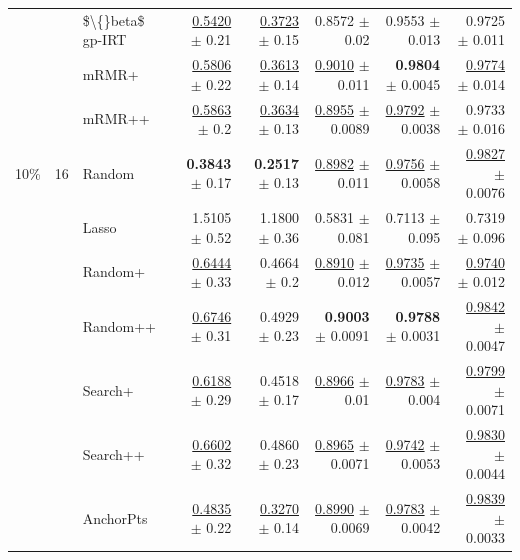 \begin{longtable}{llp{}rrrrr}
 &  & \$\textbackslash\{\}beta\$ gp-IRT & \underline{0.5420} {\scriptsize $\pm$ 0.21} & \underline{0.3723} {\scriptsize $\pm$ 0.15} & 0.8572 {\scriptsize $\pm$ 0.02} & 0.9553 {\scriptsize $\pm$ 0.013} & 0.9725 {\scriptsize $\pm$ 0.011} \\
 &  & mRMR+ & \underline{0.5806} {\scriptsize $\pm$ 0.22} & \underline{0.3613} {\scriptsize $\pm$ 0.14} & \underline{0.9010} {\scriptsize $\pm$ 0.011} & \textbf{0.9804} {\scriptsize $\pm$ 0.0045} & \underline{0.9774} {\scriptsize $\pm$ 0.014} \\
 &  & mRMR++ & \underline{0.5863} {\scriptsize $\pm$ 0.2} & \underline{0.3634} {\scriptsize $\pm$ 0.13} & \underline{0.8955} {\scriptsize $\pm$ 0.0089} & \underline{0.9792} {\scriptsize $\pm$ 0.0038} & 0.9733 {\scriptsize $\pm$ 0.016} \\
\midrule
10\% & 16 & Random & \textbf{0.3843} {\scriptsize $\pm$ 0.17} & \textbf{0.2517} {\scriptsize $\pm$ 0.13} & \underline{0.8982} {\scriptsize $\pm$ 0.011} & \underline{0.9756} {\scriptsize $\pm$ 0.0058} & \underline{0.9827} {\scriptsize $\pm$ 0.0076} \\
 &  & Lasso & 1.5105 {\scriptsize $\pm$ 0.52} & 1.1800 {\scriptsize $\pm$ 0.36} & 0.5831 {\scriptsize $\pm$ 0.081} & 0.7113 {\scriptsize $\pm$ 0.095} & 0.7319 {\scriptsize $\pm$ 0.096} \\
 &  & Random+ & \underline{0.6444} {\scriptsize $\pm$ 0.33} & 0.4664 {\scriptsize $\pm$ 0.2} & \underline{0.8910} {\scriptsize $\pm$ 0.012} & \underline{0.9735} {\scriptsize $\pm$ 0.0057} & \underline{0.9740} {\scriptsize $\pm$ 0.012} \\
 &  & Random++ & \underline{0.6746} {\scriptsize $\pm$ 0.31} & 0.4929 {\scriptsize $\pm$ 0.23} & \textbf{0.9003} {\scriptsize $\pm$ 0.0091} & \textbf{0.9788} {\scriptsize $\pm$ 0.0031} & \underline{0.9842} {\scriptsize $\pm$ 0.0047} \\
 &  & Search+ & \underline{0.6188} {\scriptsize $\pm$ 0.29} & 0.4518 {\scriptsize $\pm$ 0.17} & \underline{0.8966} {\scriptsize $\pm$ 0.01} & \underline{0.9783} {\scriptsize $\pm$ 0.004} & \underline{0.9799} {\scriptsize $\pm$ 0.0071} \\
 &  & Search++ & \underline{0.6602} {\scriptsize $\pm$ 0.32} & 0.4860 {\scriptsize $\pm$ 0.23} & \underline{0.8965} {\scriptsize $\pm$ 0.0071} & \underline{0.9742} {\scriptsize $\pm$ 0.0053} & \underline{0.9830} {\scriptsize $\pm$ 0.0044} \\
 &  & AnchorPts & \underline{0.4835} {\scriptsize $\pm$ 0.22} & \underline{0.3270} {\scriptsize $\pm$ 0.14} & \underline{0.8990} {\scriptsize $\pm$ 0.0069} & \underline{0.9783} {\scriptsize $\pm$ 0.0042} & \underline{0.9839} {\scriptsize $\pm$ 0.0033} \\

\end{longtable}
